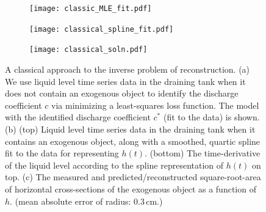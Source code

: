 \documentclass[a4paper,fleqn]{cas-sc}
\begin{document}
\begin{figure}[h!]
	\centering
	\begin{subfigure}[b]{0.48\textwidth}
		\texttt{[image: classic\_MLE\_fit.pdf]} \caption{} \label{fig:mle}
	\end{subfigure}
	
	 \begin{subfigure}[b]{0.5\textwidth}
		\texttt{[image: classical\_spline\_fit.pdf]} \caption{} \label{fig:spline_fit}
	\end{subfigure}
	\begin{subfigure}[b]{0.4\textwidth}
		\texttt{[image: classical\_soln.pdf]} \caption{} \label{fig:classical_soln}
	\end{subfigure}
	\caption{A classical approach to the inverse problem of reconstruction.
	(a) We use liquid level time series data in the draining tank when it does not contain an exogenous object to identify the discharge coefficient $c$ via minimizing a least-squares loss function. The model with the identified discharge coefficient $c^*$ (fit to the data) is shown.
	(b) (top) Liquid level time series data in the draining tank when it contains an exogenous object, along with a smoothed, quartic spline fit to the data for representing $h(t)$. (bottom) The time-derivative of the liquid level according to the spline representation of $h(t)$ on top.
	(c) The measured and predicted/reconstructed square-root-area of horizontal cross-sections of the exogenous object as a function of $h$.
	(mean absolute error of radius: 0.3\,cm.)
	}
\end{figure}



\clearpage



 
\end{document}
